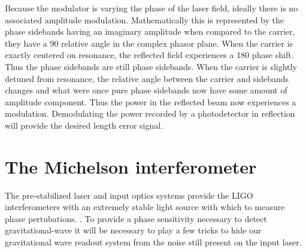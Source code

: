 Because the modulator is varying the phase of the laser field, ideally there is no associated amplitude modulation. %
Mathematically this is represented by the phase sidebands having an imaginary amplitude when compared to the carrier, they have a 90\degrees{} relative angle in the complex phasor plane. %
When the carrier is exactly centered on resonance, the reflected field experiences a 180\degrees{} phase shift. %
Thus the phase sidebands are still phase sidebands. %
When the carrier is slightly detuned from resonance, the relative angle between the carrier and sidebands changes and what were once pure phase sidebands now have some amount of amplitude component. %
Thus the power in the reflected beam now experiences a modulation. %
Demodulating the power recorded by a photodetector in reflection will provide the desired length error signal.

\section{The Michelson interferometer}
The pre-stabilized laser and input optics systems provide the LIGO interferometers with an extremely stable light source with which to measure phase pertubations. %
. %
To provide a phase sensitivity necessary to detect gravitational-wave it will be necessary to play a few tricks to hide our gravitational wave readout system from the noise still present on the input laser.

